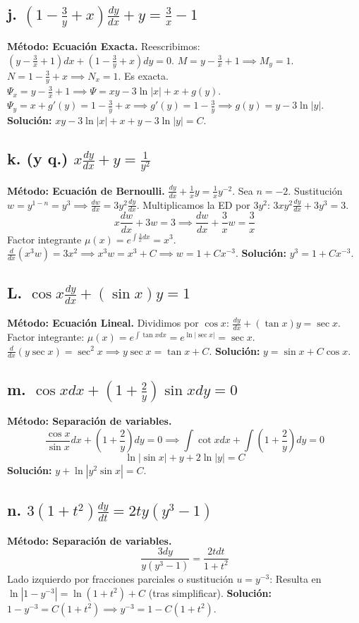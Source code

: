 \documentclass[a4paper]{article}
\begin{document}
\subsection*{j. $(1 - \frac{3}{y} + x) \frac{dy}{dx} + y = \frac{3}{x} - 1$}
\textbf{Método: Ecuación Exacta.}
Reescribimos: $(y - \frac{3}{x} + 1) dx + (1 - \frac{3}{y} + x) dy = 0$.
$M = y - \frac{3}{x} + 1 \implies M_y = 1$.
$N = 1 - \frac{3}{y} + x \implies N_x = 1$. Es exacta.
$\Psi_x = y - \frac{3}{x} + 1 \implies \Psi = xy - 3\ln|x| + x + g(y)$.
$\Psi_y = x + g'(y) = 1 - \frac{3}{y} + x \implies g'(y) = 1 - \frac{3}{y} \implies g(y) = y - 3\ln|y|$.
\textbf{Solución:} $xy - 3\ln|x| + x + y - 3\ln|y| = C$.


\subsection*{k. (y q.) $x \frac{dy}{dx} + y = \frac{1}{y^2}$}
\textbf{Método: Ecuación de Bernoulli.}
$\frac{dy}{dx} + \frac{1}{x}y = \frac{1}{x}y^{-2}$. Sea $n = -2$. Sustitución $w = y^{1-n} = y^3 \implies \frac{dw}{dx} = 3y^2 \frac{dy}{dx}$.
Multiplicamos la ED por $3y^2$: $3xy^2 \frac{dy}{dx} + 3y^3 = 3$.
$$x \frac{dw}{dx} + 3w = 3 \implies \frac{dw}{dx} + \frac{3}{x}w = \frac{3}{x}$$
Factor integrante $\mu(x) = e^{\int \frac{3}{x} dx} = x^3$.
$\frac{d}{dx}(x^3 w) = 3x^2 \implies x^3 w = x^3 + C \implies w = 1 + Cx^{-3}$.
\textbf{Solución:} $y^3 = 1 + Cx^{-3}$.

\subsection*{L. $\cos x \frac{dy}{dx} + (\sin x)y = 1$}
\textbf{Método: Ecuación Lineal.}
Dividimos por $\cos x$: $\frac{dy}{dx} + (\tan x)y = \sec x$.
Factor integrante: $\mu(x) = e^{\int \tan x dx} = e^{\ln|\sec x|} = \sec x$.
$\frac{d}{dx}(y \sec x) = \sec^2 x \implies y \sec x = \tan x + C$.
\textbf{Solución:} $y = \sin x + C \cos x$.

\subsection*{m. $\cos x dx + (1 + \frac{2}{y}) \sin x dy = 0$}
\textbf{Método: Separación de variables.}
$$\frac{\cos x}{\sin x} dx + (1 + \frac{2}{y}) dy = 0 \implies \int \cot x dx + \int (1 + \frac{2}{y}) dy = 0$$
$$\ln|\sin x| + y + 2\ln|y| = C$$
\textbf{Solución:} $y + \ln|y^2 \sin x| = C$.

\subsection*{n. $3(1 + t^2) \frac{dy}{dt} = 2ty(y^3 - 1)$}
\textbf{Método: Separación de variables.}
$$\frac{3 dy}{y(y^3 - 1)} = \frac{2t dt}{1 + t^2}$$
Lado izquierdo por fracciones parciales o sustitución $u = y^{-3}$:
Resulta en $\ln|1 - y^{-3}| = \ln(1+t^2) + C$ (tras simplificar).
\textbf{Solución:} $1 - y^{-3} = C(1+t^2) \implies y^{-3} = 1 - C(1+t^2)$.
\end{document}
